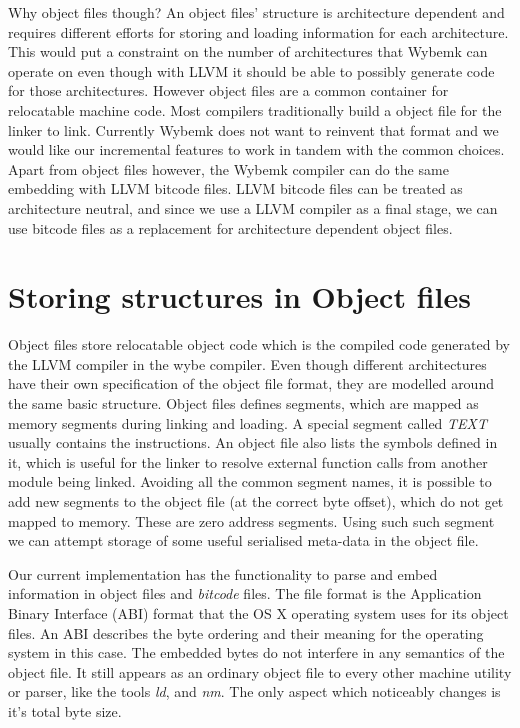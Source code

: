 Why object files though? An object files' structure is architecture dependent
and requires different efforts for storing and loading information for each
architecture. This would put a constraint on the number of architectures that
Wybemk can operate on even though with LLVM it should be able to possibly
generate code for those architectures. However object files are a common
container for relocatable machine code. Most compilers traditionally build a
object file for the linker to link. Currently Wybemk does not want to reinvent
that format and we would like our incremental features to work in tandem with
the common choices. Apart from object files however, the Wybemk compiler can do
the same embedding with LLVM bitcode files. LLVM bitcode files can be treated
as architecture neutral, and since we use a LLVM compiler as a final stage, we
can use bitcode files as a replacement for architecture dependent object files.


\section{Storing structures in Object files}

Object files store relocatable object code which is the compiled code generated
by the LLVM compiler in the wybe compiler. Even though different architectures
have their own specification of the object file format, they are modelled
around the same basic structure. Object files defines segments, which are
mapped as memory segments during linking and loading. A special segment called
\textit{TEXT} usually contains the instructions. An object file also lists the
symbols defined in it, which is useful for the linker to resolve external
function calls from another module being linked. Avoiding all the common
segment names, it is possible to add new segments to the object file (at the
correct byte offset), which do not get mapped to memory. These are zero address
segments. Using such such segment we can attempt storage of some useful
serialised meta-data in the object file. 

Our current implementation has the functionality to parse and embed information
in \macho object files and \textit{bitcode} files. The \macho file format is
the Application Binary Interface (ABI) format that the OS X operating system
uses for its object files. An ABI describes the byte ordering and their meaning
for the operating system in this case. The embedded bytes do not interfere in
any semantics of the object file. It still appears as an ordinary object file
to every other machine utility or parser, like the tools \textit{ld}, and
\textit{nm}. The only aspect which noticeably changes is it's total byte size.



